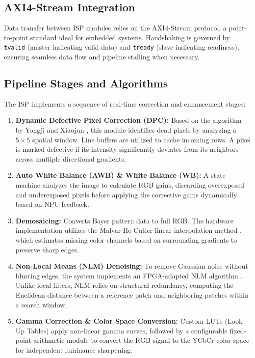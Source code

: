 \documentclass[conference]{IEEEtran}
\begin{document}
\subsection{AXI4-Stream Integration}
Data transfer between ISP modules relies on the AXI4-Stream protocol, a point-to-point standard ideal for embedded systems. Handshaking is governed by \texttt{tvalid} (master indicating valid data) and \texttt{tready} (slave indicating readiness), ensuring seamless data flow and pipeline stalling when necessary.

\subsection{Pipeline Stages and Algorithms}
The ISP implements a sequence of real-time correction and enhancement stages:
\begin{enumerate}
    \item \textbf{Dynamic Defective Pixel Correction (DPC):} Based on the algorithm by Yongji and Xiaojun \cite{yongji2020}, this module identifies dead pixels by analyzing a $5 \times 5$ spatial window. Line buffers are utilized to cache incoming rows. A pixel is marked defective if its intensity significantly deviates from its neighbors across multiple directional gradients.
    \item \textbf{Auto White Balance (AWB) \& White Balance (WB):} A state machine analyzes the image to calculate RGB gains, discarding overexposed and underexposed pixels before applying the corrective gains dynamically based on NPU feedback.
    \item \textbf{Demosaicing:} Converts Bayer pattern data to full RGB. The hardware implementation utilizes the Malvar-He-Cutler linear interpolation method \cite{getreuer2011}, which estimates missing color channels based on surrounding gradients to preserve sharp edges.
    \item \textbf{Non-Local Means (NLM) Denoising:} To remove Gaussian noise without blurring edges, the system implements an FPGA-adapted NLM algorithm \cite{koizumi2020}. Unlike local filters, NLM relies on structural redundancy, computing the Euclidean distance between a reference patch and neighboring patches within a search window.
    \item \textbf{Gamma Correction \& Color Space Conversion:} Custom LUTs (Look-Up Tables) apply non-linear gamma curves, followed by a configurable fixed-point arithmetic module to convert the RGB signal to the YCbCr color space for independent luminance sharpening.
\end{enumerate}
\end{document}

